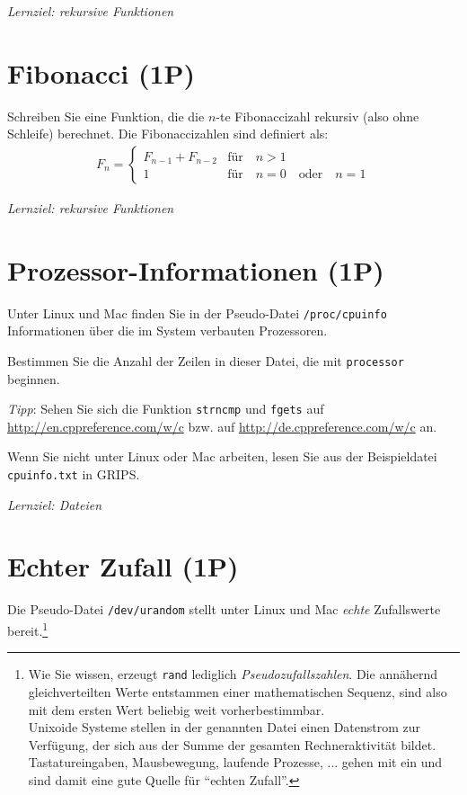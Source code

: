 \documentclass[
	ngerman,
	fontsize=10pt,
	parskip=half,
	titlepage=true,
	DIV=12
]{scrartcl}
\begin{document}
\emph{Lernziel: rekursive Funktionen}


\section{Fibonacci (1P)}
Schreiben Sie eine Funktion, die die $n$-te Fibonaccizahl rekursiv (also ohne Schleife) berechnet.
Die Fibonaccizahlen sind definiert als:
\begin{gather*}
  F_n =
    \begin{cases}
      F_{n-1} + F_{n-2} & \text{für}\quad n > 1\\
      1 & \text{für}\quad n=0\quad\text{oder}\quad n=1
    \end{cases}
\end{gather*}

\emph{Lernziel: rekursive Funktionen}



\section{Prozessor-Informationen (1P)}
Unter Linux und Mac finden Sie in der Pseudo-Datei \texttt{/proc/cpuinfo} Informationen über die im System verbauten Prozessoren.

Bestimmen Sie die Anzahl der Zeilen in dieser Datei, die mit \texttt{processor} beginnen.

\emph{Tipp}: Sehen Sie sich die Funktion \texttt{strncmp} und \texttt{fgets} auf \url{http://en.cppreference.com/w/c} bzw. auf \url{http://de.cppreference.com/w/c} an.

Wenn Sie nicht unter Linux oder Mac arbeiten, lesen Sie aus der Beispieldatei \texttt{cpuinfo.txt} in GRIPS.

\emph{Lernziel: Dateien}


\section{Echter Zufall (1P)}
Die Pseudo-Datei \texttt{/dev/urandom} stellt unter Linux und Mac \emph{echte} Zufallswerte bereit.\footnote{Wie Sie wissen, erzeugt \texttt{rand} lediglich \emph{Pseudozufallszahlen}. Die annähernd gleichverteilten Werte entstammen einer mathematischen Sequenz, sind also mit dem ersten Wert beliebig weit vorherbestimmbar.\\
Unixoide Systeme stellen in der genannten Datei einen Datenstrom zur Verfügung, der sich aus der Summe der gesamten Rechneraktivität bildet. Tastatureingaben, Mausbewegung, laufende Prozesse, ... gehen mit ein und sind damit eine gute Quelle für \enquote{echten Zufall}.}
\end{document}
